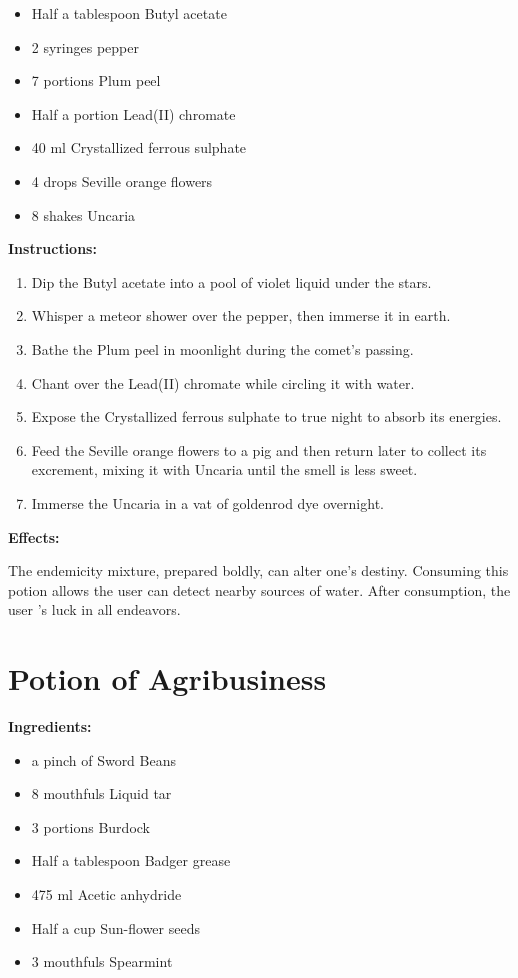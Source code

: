 \documentclass{article}
\begin{document}
\begin{itemize}
  \item Half a tablespoon Butyl acetate
  \item 2 syringes pepper
  \item 7 portions Plum peel
  \item Half a portion Lead(II) chromate
  \item 40 ml Crystallized ferrous sulphate
  \item 4 drops Seville orange flowers
  \item 8 shakes Uncaria
\end{itemize}

\textbf{Instructions:}

\begin{enumerate}
  \item Dip the Butyl acetate into a pool of violet liquid under the stars.
  \item Whisper a meteor shower over the pepper, then immerse it in earth.
  \item Bathe the Plum peel in moonlight during the comet’s passing.
  \item Chant over the Lead(II) chromate while circling it with water.
  \item Expose the Crystallized ferrous sulphate to true night to absorb its energies.
  \item Feed the Seville orange flowers to a pig and then return later to collect its excrement, mixing it with Uncaria until the smell is less sweet.
  \item Immerse the Uncaria in a vat of goldenrod dye overnight.
\end{enumerate}

\textbf{Effects:}

The endemicity mixture, prepared boldly, can alter one's destiny. Consuming this potion allows the user can detect nearby sources of water. After consumption, the user 's luck in all endeavors.

\newpage
\section*{Potion of Agribusiness}

\textbf{Ingredients:}

\begin{itemize}
  \item a pinch of Sword Beans
  \item 8 mouthfuls Liquid tar
  \item 3 portions Burdock
  \item Half a tablespoon Badger grease
  \item 475 ml Acetic anhydride
  \item Half a cup Sun-flower seeds
  \item 3 mouthfuls Spearmint
\end{itemize}
\end{document}
